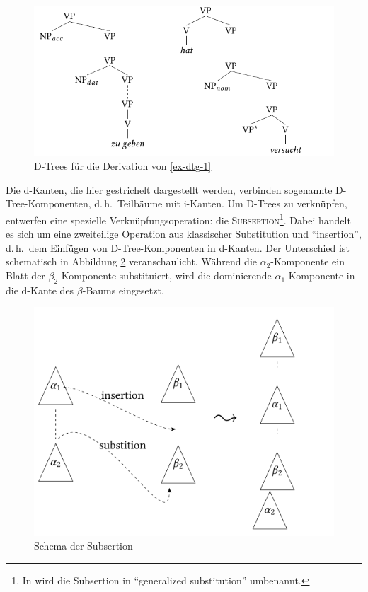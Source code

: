 \begin{figure}[t]
\centering
\includegraphics{graphics/abb68.pdf}
\caption{\label{fig-dtg-1}D-Trees für die Derivation von \ref{ex-dtg-1}}
\end{figure}
Die d-Kanten, die hier gestrichelt dargestellt werden, verbinden sogenannte D-Tree-Kompo\-nenten, d.\,h.\ Teilbäume mit i-Kanten. Um D-Trees zu verknüpfen, entwerfen \cite{Rambow:etal:95} eine spezielle Verknüpfungsoperation: die \textsc{Subsertion}\footnote{In \cite{Rambow:etal:01} wird die Subsertion in "`generalized substitution"' umbenannt.}. Dabei handelt es sich um eine zweiteilige Operation aus klassischer Substitution und "`insertion"', d.\,h.\ dem Einfügen von D-Tree-Komponenten in d-Kanten. Der Unterschied ist schematisch in Abbildung \ref{fig-dtg-3} veranschaulicht. Während die $\alpha_2$-Komponente ein Blatt der $\beta_2$-Komponente substituiert, wird die dominierende $\alpha_1$-Komponente in die d-Kante des $\beta$-Baums eingesetzt. 
\begin{figure}
\centering
\includegraphics{graphics/abb69.pdf}
\caption{\label{fig-dtg-3}Schema der Subsertion}
\end{figure}
